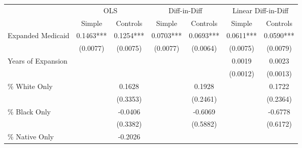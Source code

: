 \centering
\begin{tabular}{lllllll}
\cline{1-7}
\multicolumn{1}{c}{} &
  \multicolumn{2}{c}{OLS} &
  \multicolumn{2}{c}{Diff-in-Diff} &
  \multicolumn{2}{c}{Linear Diff-in-Diff} \\
\cline{2-7}
\multicolumn{1}{c}{} &
  \multicolumn{1}{c}{Simple} &
  \multicolumn{1}{c}{Controls} &
  \multicolumn{1}{c}{Simple} &
  \multicolumn{1}{c}{Controls} &
  \multicolumn{1}{c}{Simple} &
  \multicolumn{1}{c}{Controls} \\
\cline{1-7}
\multicolumn{1}{l}{Expanded Medicaid} &
  \multicolumn{1}{c}{0.1463***} &
  \multicolumn{1}{c}{0.1254***} &
  \multicolumn{1}{c}{0.0703***} &
  \multicolumn{1}{c}{0.0693***} &
  \multicolumn{1}{c}{0.0611***} &
  \multicolumn{1}{c}{0.0590***} \\
\multicolumn{1}{l}{} &
  \multicolumn{1}{c}{(0.0077)} &
  \multicolumn{1}{c}{(0.0075)} &
  \multicolumn{1}{c}{(0.0077)} &
  \multicolumn{1}{c}{(0.0064)} &
  \multicolumn{1}{c}{(0.0075)} &
  \multicolumn{1}{c}{(0.0079)} \\
\multicolumn{1}{l}{Years of Expansion} &
  \multicolumn{1}{c}{} &
  \multicolumn{1}{c}{} &
  \multicolumn{1}{c}{} &
  \multicolumn{1}{c}{} &
  \multicolumn{1}{c}{0.0019} &
  \multicolumn{1}{c}{0.0023} \\
\multicolumn{1}{l}{} &
  \multicolumn{1}{c}{} &
  \multicolumn{1}{c}{} &
  \multicolumn{1}{c}{} &
  \multicolumn{1}{c}{} &
  \multicolumn{1}{c}{(0.0012)} &
  \multicolumn{1}{c}{(0.0013)} \\
\multicolumn{1}{l}{\% White Only} &
  \multicolumn{1}{c}{} &
  \multicolumn{1}{c}{0.1628} &
  \multicolumn{1}{c}{} &
  \multicolumn{1}{c}{0.1928} &
  \multicolumn{1}{c}{} &
  \multicolumn{1}{c}{0.1722} \\
\multicolumn{1}{l}{} &
  \multicolumn{1}{c}{} &
  \multicolumn{1}{c}{(0.3353)} &
  \multicolumn{1}{c}{} &
  \multicolumn{1}{c}{(0.2461)} &
  \multicolumn{1}{c}{} &
  \multicolumn{1}{c}{(0.2364)} \\
\multicolumn{1}{l}{\% Black Only} &
  \multicolumn{1}{c}{} &
  \multicolumn{1}{c}{-0.0406} &
  \multicolumn{1}{c}{} &
  \multicolumn{1}{c}{-0.6069} &
  \multicolumn{1}{c}{} &
  \multicolumn{1}{c}{-0.6778} \\
\multicolumn{1}{l}{} &
  \multicolumn{1}{c}{} &
  \multicolumn{1}{c}{(0.3382)} &
  \multicolumn{1}{c}{} &
  \multicolumn{1}{c}{(0.5882)} &
  \multicolumn{1}{c}{} &
  \multicolumn{1}{c}{(0.6172)} \\
\multicolumn{1}{l}{\% Native Only} &
  \multicolumn{1}{c}{} &
  \multicolumn{1}{c}{-0.2026} &

\end{tabular}
